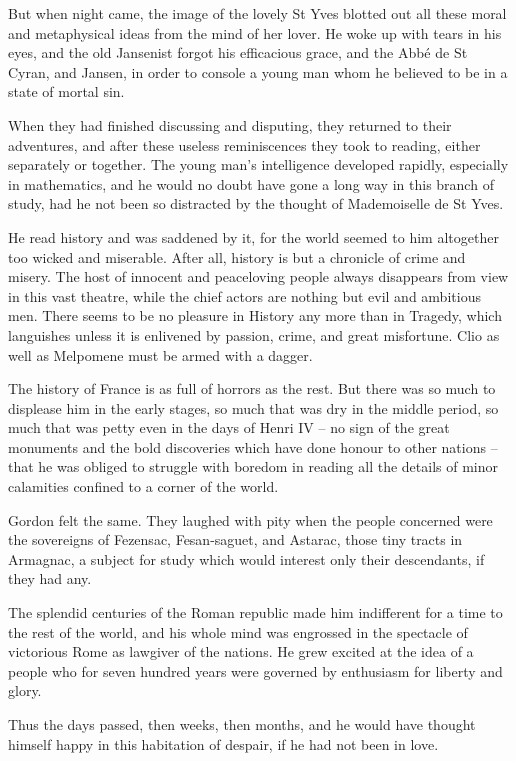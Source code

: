 \documentclass{article}
\begin{document}
\begin{center}
But when night came, the image of the lovely St Yves blotted out all these moral 
and metaphysical ideas from the mind of her lover. He woke up with tears in his 
eyes, and the old Jansenist forgot his efficacious grace, and the Abbé de St Cyran, 
and Jansen, in order to console a young man whom he believed to be in a state of 
mortal sin. 

When they had finished discussing and disputing, they returned to their adventures, 
and after these useless reminiscences they took to reading, either separately or 
together. The young man's intelligence developed rapidly, especially in mathematics, 
and he would no doubt have gone a long way in this branch of study, had he not 
been so distracted by the thought of Mademoiselle de St Yves. 

He read history and was saddened by it, for the world seemed to him altogether 
too wicked and miserable. After all, history is but a chronicle of crime and misery. 
The host of innocent and peaceloving people always disappears from view in this 
vast theatre, while the chief actors are nothing but evil and ambitious men. There 
seems to be no pleasure in History any more than in Tragedy, which languishes unless 
it is enlivened by passion, crime, and great misfortune. Clio as well as Melpomene 
must be armed with a dagger. 

The history of France is as full of horrors as the rest. But there was so much 
to displease him in the early stages, so much that was dry in the middle period, 
so much that was petty even in the days of Henri IV – no sign of the great monuments 
and the bold discoveries which have done honour to other nations – that he was 
obliged to struggle with boredom in reading all the details of minor calamities 
confined to a corner of the world. 

Gordon felt the same. They laughed with pity when the people concerned were the 
sovereigns of Fezensac, Fesan-saguet, and Astarac, those tiny tracts in Armagnac, 
a subject for study which would interest only their descendants, if they had any. 

The splendid centuries of the Roman republic made him indifferent for a time to 
the rest of the world, and his whole mind was engrossed in the spectacle of victorious 
Rome as lawgiver of the nations. He grew excited at the idea of a people who for 
seven hundred years were governed by enthusiasm for liberty and glory. 

Thus the days passed, then weeks, then months, and he would have thought himself 
happy in this habitation of despair, if he had not been in love. 


\end{center}
\end{document}
